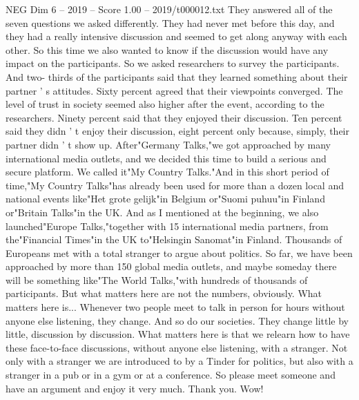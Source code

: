 \begin{textsample}{NEG Dim 6 – 2019 – Score 1.00 – 2019/t000012.txt}
They answered all of the seven questions we asked differently.
They had never met before this day, and they had a really intensive discussion and seemed to get along anyway with each other.
So this time we also wanted to know if the discussion would have any impact on the participants.
So we asked researchers to survey the participants.
And two- thirds of the participants said that they learned something about their partner ' s attitudes.
Sixty percent agreed that their viewpoints converged.
The level of trust in society seemed also higher after the event, according to the researchers.
Ninety percent said that they enjoyed their discussion.
Ten percent said they didn ' t enjoy their discussion, eight percent only because, simply, their partner didn ' t show up.
After"Germany Talks,"we got approached by many international media outlets, and we decided this time to build a serious and secure platform.
We called it"My Country Talks."And in this short period of time,"My Country Talks"has already been used for more than a dozen local and national events like"Het grote gelijk"in Belgium or"Suomi puhuu"in Finland or"Britain Talks"in the UK.
And as I mentioned at the beginning, we also launched"Europe Talks,"together with 15 international media partners, from the"Financial Times"in the UK to"Helsingin Sanomat"in Finland.
Thousands of Europeans met with a total stranger to argue about politics.
So far, we have been approached by more than 150 global media outlets, and maybe someday there will be something like"The World Talks,"with hundreds of thousands of participants.
But what matters here are not the numbers, obviously.
What matters here is...
Whenever two people meet to talk in person for hours without anyone else listening, they change.
And so do our societies.
They change little by little, discussion by discussion.
What matters here is that we relearn how to have these face-to-face discussions, without anyone else listening, with a stranger.
Not only with a stranger we are introduced to by a Tinder for politics, but also with a stranger in a pub or in a gym or at a conference.
So please meet someone and have an argument and enjoy it very much.
Thank you.
Wow!

\end{textsample}
